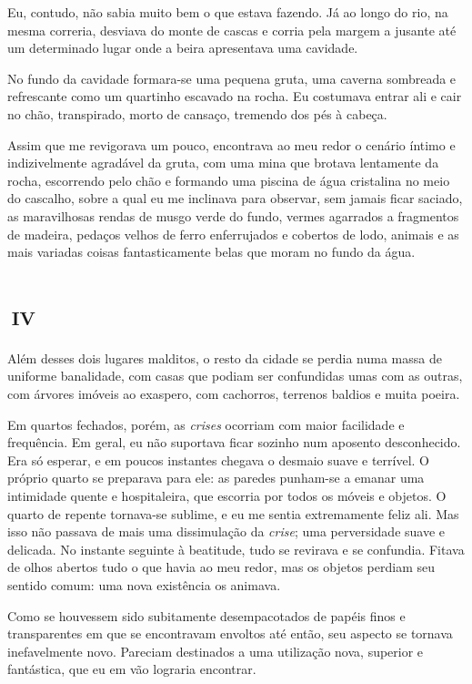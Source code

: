 Eu, contudo, não sabia muito bem o que estava fazendo. Já ao longo do rio, na mesma correria, desviava do monte de cascas e corria pela margem a jusante até um determinado lugar onde a beira apresentava uma cavidade.

No fundo da cavidade formara-se uma pequena gruta, uma caverna sombreada e refrescante como um quartinho escavado na rocha. Eu costumava entrar ali e cair no chão, transpirado, morto de cansaço, tremendo dos pés à cabeça.

Assim que me revigorava um pouco, encontrava ao meu redor o cenário íntimo e indizivelmente agradável da gruta, com uma mina que brotava lentamente da rocha, escorrendo pelo chão e formando uma piscina de água cristalina no meio do cascalho, sobre a qual eu me inclinava para observar, sem jamais ficar saciado, as maravilhosas rendas de musgo verde do fundo, vermes agarrados a fragmentos de madeira, pedaços velhos de ferro enferrujados e cobertos de lodo, animais e as mais variadas coisas fantasticamente belas que moram no fundo da água.


\chapter*{\small{}\,\Large\centering\textsc{iv}\,\small{}}

Além desses dois lugares malditos, o resto da cidade se perdia numa massa de uniforme banalidade, com casas que podiam ser confundidas umas com as outras, com árvores imóveis ao exaspero, com cachorros, terrenos baldios e muita poeira.

Em quartos fechados, porém, as \textit{crises} ocorriam com maior facilidade e frequência. Em geral, eu não suportava ficar sozinho num aposento desconhecido. Era só esperar, e em poucos instantes chegava o desmaio suave e terrível. O próprio quarto se preparava para ele: as paredes punham-se a emanar uma intimidade quente e hospitaleira, que escorria por todos os móveis e objetos. O quarto de repente tornava-se sublime, e eu me sentia extremamente feliz ali. Mas isso não passava de mais uma dissimulação da \textit{crise}; uma perversidade suave e delicada. No instante seguinte à beatitude, tudo se revirava e se confundia. Fitava de olhos abertos tudo o que havia ao meu redor, mas os objetos perdiam seu sentido comum: uma nova existência os animava.

Como se houvessem sido subitamente desempacotados de papéis finos e transparentes em que se encontravam envoltos até então, seu aspecto se tornava inefavelmente novo. Pareciam destinados a uma utilização nova, superior e fantástica, que eu em vão lograria encontrar.

